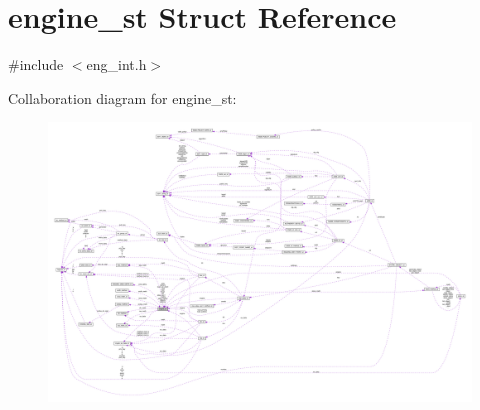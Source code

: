 \hypertarget{structengine__st}{}\section{engine\+\_\+st Struct Reference}
\label{structengine__st}


{\ttfamily \#include $<$eng\+\_\+int.\+h$>$}



Collaboration diagram for engine\+\_\+st\+:\nopagebreak
\begin{figure}[H]
\begin{center}
\leavevmode
\includegraphics[width=350pt]{structengine__st__coll__graph}
\end{center}
\end{figure}
